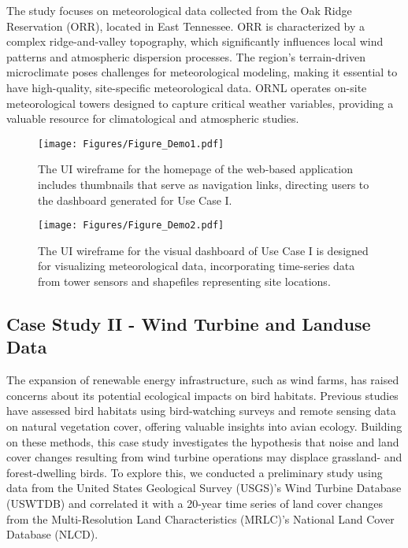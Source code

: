 The study focuses on meteorological data collected from the Oak Ridge Reservation (ORR), located in East Tennessee. ORR is characterized by a complex ridge-and-valley topography, which significantly influences local wind patterns and atmospheric dispersion processes. The region’s terrain-driven microclimate poses challenges for meteorological modeling, making it essential to have high-quality, site-specific meteorological data. ORNL operates on-site meteorological towers designed to capture critical weather variables, providing a valuable resource for climatological and atmospheric studies.


\begin{figure*}[htbp]
 \centering
\texttt{[image: Figures/Figure\_Demo1.pdf]}
 \caption{The UI wireframe for the homepage of the web-based application includes thumbnails that serve as navigation links, directing users to the dashboard generated for Use Case I. }
 \label{fig:demo-1}
\end{figure*}


\begin{figure*}[htbp]
 \centering
\texttt{[image: Figures/Figure\_Demo2.pdf]}
 \caption{The UI wireframe for the visual dashboard of Use Case I is designed for visualizing meteorological data, incorporating time-series data from tower sensors and shapefiles representing site locations. }
 \label{fig:demo-2}
\end{figure*}

\subsection{Case Study II - Wind Turbine and Landuse Data}
The expansion of renewable energy infrastructure, such as wind farms, has raised concerns about its potential ecological impacts on bird habitats. Previous studies have assessed bird habitats using bird-watching surveys and remote sensing data on natural vegetation cover, offering valuable insights into avian ecology. Building on these methods, this case study investigates the hypothesis that noise and land cover changes resulting from wind turbine operations may displace grassland- and forest-dwelling birds. To explore this, we conducted a preliminary study using data from the United States Geological Survey (USGS)’s Wind Turbine Database (USWTDB) and correlated it with a 20-year time series of land cover changes from the Multi-Resolution Land Characteristics (MRLC)’s National Land Cover Database (NLCD).

